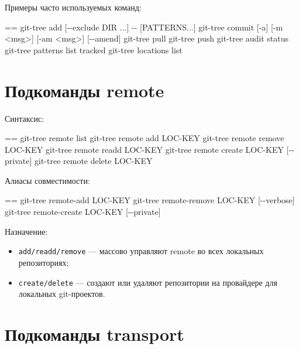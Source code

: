 \documentclass{book}
\makeatletter
\newenvironment{Texinfopreformatted}{%
  \par\GNUTobeylines\obeyspaces\frenchspacing\parskip=\z@\parindent=\z@}{}
{\catcode`\^^M=13 \gdef\GNUTobeylines{\catcode`\^^M=13 \def^^M{\null\par}}}
\newenvironment{Texinfoindented}{\begin{list}{}{}\item\relax}{\end{list}}
\renewcommand{\_}{\Texinfounderscore\discretionary{}{}{}}
\makeatother
\begin{document}
Примеры часто используемых команд:
\begin{Texinfoindented}
\begin{Texinfopreformatted}%
\ttfamily git-tree add [{-}{-}exclude DIR ...] {-}{-} [PATTERNS...]
git-tree commit [-a] [-m <msg>] [-am <msg>] [{-}{-}amend]
git-tree pull
git-tree push
git-tree audit status
git-tree patterns list tracked
git-tree locations list
\end{Texinfopreformatted}
\end{Texinfoindented}

\chapter{{Подкоманды remote}}
\label{anchor:_041f_043e_0434_043a_043e_043c_0430_043d_0434_044b-remote}%

Синтаксис:
\begin{Texinfoindented}
\begin{Texinfopreformatted}%
\ttfamily git-tree remote list
git-tree remote add LOC-KEY
git-tree remote remove LOC-KEY
git-tree remote readd LOC-KEY
git-tree remote create LOC-KEY [{-}{-}private]
git-tree remote delete LOC-KEY
\end{Texinfopreformatted}
\end{Texinfoindented}

Алиасы совместимости:
\begin{Texinfoindented}
\begin{Texinfopreformatted}%
\ttfamily git-tree remote-add LOC-KEY
git-tree remote-remove LOC-KEY [{-}{-}verbose]
git-tree remote-create LOC-KEY [{-}{-}private]
\end{Texinfopreformatted}
\end{Texinfoindented}

Назначение:
\begin{itemize}[label=\textbullet{}]
\item \texttt{add/readd/remove} — массово управляют remote во всех локальных репозиториях;
\item \texttt{create/delete} — создают или удаляют репозитории на провайдере для локальных git-проектов.
\end{itemize}

\chapter{{Подкоманды transport}}
\label{anchor:_041f_043e_0434_043a_043e_043c_0430_043d_0434_044b-transport}%
\end{document}
